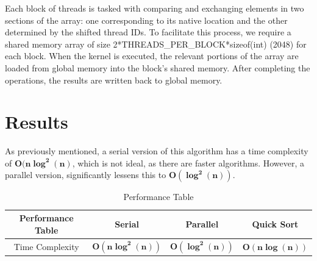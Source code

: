 \documentclass[12pt]{report}
\begin{document}
Each block of threads is tasked with comparing and exchanging elements in two sections of the array: one corresponding to its native location and the other determined by the shifted thread IDs. To facilitate this process, we require a shared memory array of size 2*THREADS\_PER\_BLOCK*sizeof(int) (2048) for each block. When the kernel is executed, the relevant portions of the array are loaded from global memory into the block's shared memory. After completing the operations, the results are written back to global memory.

\chapter{Results}
As previously mentioned, a serial version of this algorithm has a time complexity of $\boldsymbol{O(n \log^2(n)}$, which is not ideal, as there are faster algorithms. However, a parallel version, significantly lessens this to $\boldsymbol{O(\log^2(n))}$.

\begin{table}[h!]
    \centering
    \begin{tabular}{|c|c|c|c|}
        \hline
        \rule{0pt}{3ex}\textbf{Performance Table} & \textbf{Serial}                 & \textbf{Parallel}          & \textbf{Quick Sort}          \\ \hline
        \rule{0pt}{3ex}Time Complexity            & \(\boldsymbol{O(n \log^2(n))}\) & \(\boldsymbol{O(\log^2(n))}\) & \(\boldsymbol{O(n\log(n))}\) \\ \hline
    \end{tabular}
    \caption{Performance Table}
    \label{tab:simple_table}
\end{table}

\begin{center}
\end{center}
\end{document}
